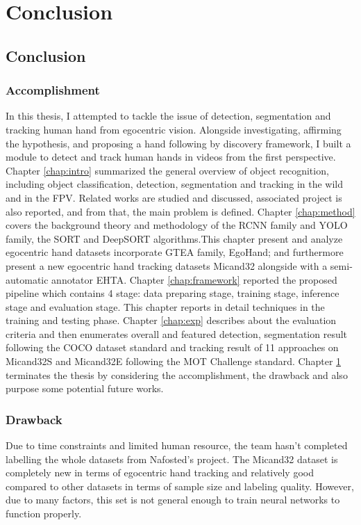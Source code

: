 \chapter{Conclusion}\label{chap:conclusion}
\section{Conclusion}
\subsection{Accomplishment}
In this thesis, I attempted to tackle the issue of detection, segmentation and tracking human hand from egocentric vision. Alongside investigating, affirming the hypothesis, and proposing a hand following by discovery framework, I built a module to detect and track human hands in videos from the first perspective. Chapter \ref{chap:intro} summarized the general overview of object recognition, including object classification, detection, segmentation and tracking in the wild and in the FPV. Related works are studied and discussed, associated project is also reported, and from that, the main problem is defined. Chapter \ref{chap:method} covers the background theory and methodology of the RCNN family and YOLO family, the SORT and DeepSORT algorithms.This chapter present and analyze egocentric hand datasets incorporate GTEA family, EgoHand; and furthermore present a new egocentric hand tracking datasets Micand32 alongside with a semi-automatic annotator EHTA. Chapter \ref{chap:framework} reported the proposed pipeline which contains 4 stage: data preparing stage, training stage, inference stage and evaluation stage. This chapter reports in detail techniques in the training and testing phase. Chapter \ref{chap:exp} describes about the evaluation criteria and then enumerates overall and featured detection, segmentation result following the COCO dataset standard and tracking result of 11 approaches on Micand32S and Micand32E following the MOT Challenge standard. Chapter \ref{chap:conclusion} terminates the thesis by considering the accomplishment, the drawback and also purpose some potential future works.
\subsection{Drawback}
Due to time constraints and limited human resource, the team hasn't completed labelling the whole datasets from Nafosted's project. The Micand32 dataset is completely new in terms of egocentric hand tracking and relatively good compared to other datasets in terms of sample size and labeling quality. However, due to many factors, this set is not general enough to train neural networks to function properly.

